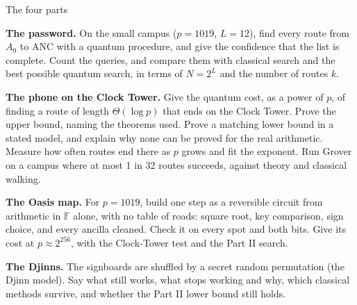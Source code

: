 \documentclass[aspectratio=169,10pt]{beamer}
\begin{document}
\begin{frame}{The four parts}
\footnotesize
\begin{description}\setlength{\itemsep}{3pt}
\item[Part I] \textbf{The password.} On the small campus ($p=1019$, $L=12$), find every route from $A_0$ to ANC with a quantum procedure, and give the confidence that the list is complete. Count the queries, and compare them with classical search and the best possible quantum search, in terms of $N=2^L$ and the number of routes $k$.
\item[Part II] \textbf{The phone on the Clock Tower.} Give the quantum cost, as a power of $p$, of finding a route of length $\Theta(\log p)$ that ends on the Clock Tower. Prove the upper bound, naming the theorems used. Prove a matching lower bound in a stated model, and explain why none can be proved for the real arithmetic. Measure how often routes end there as $p$ grows and fit the exponent. Run Grover on a campus where at most 1 in 32 routes succeeds, against theory and classical walking.
\item[Part III] \textbf{The Oasis map.} For $p=1019$, build one step as a reversible circuit from arithmetic in $\mathbb F$ alone, with no table of roads: square root, key comparison, sign choice, and every ancilla cleaned. Check it on every spot and both bits. Give its cost at $p\approx2^{256}$, with the Clock-Tower test and the Part II search.
\item[Part IV] \textbf{The Djinns.} The signboards are shuffled by a secret random permutation (the Djinn model). Say what still works, what stops working and why, which classical methods survive, and whether the Part II lower bound still holds.
\end{description}
\end{frame}
\end{document}

